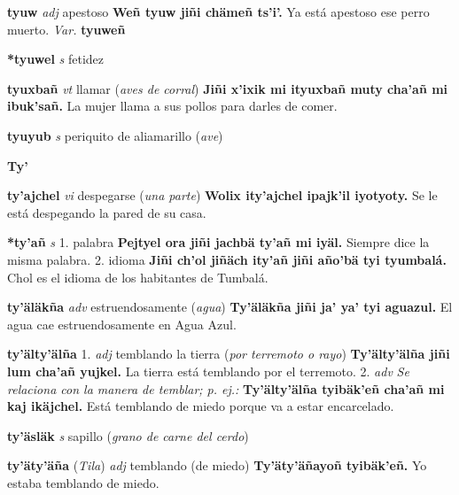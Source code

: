 \documentclass[10pt]{scrbook}
\newcommand{\entry}[1]{\textbf{#1}}
\newcommand{\alphaletter}[1]{\end{multicols}\addsec{#1}\begin{multicols}{2}}
\newcommand{\onedefinition}[1]{#1.}
\newcommand{\nontranslationdef}[1]{\textit{#1}}
\newcommand{\partofspeech}[1]{\textit{#1}}
\newcommand{\spanishtranslation}[1]{#1}
\newcommand{\clarification}[1]{(\textit{#1})}
\newcommand{\cholexample}[1]{\textbf{#1}}
\newcommand{\exampletranslation}[1]{#1}
\newcommand{\relevantdialect}[1]{(\textit{#1})}
\newcommand{\variation}[1]{\textit{Var.} \textbf{#1}}
\begin{document}
\begin{multicols}{2}
\entry{tyuw}
\partofspeech{adj}
\spanishtranslation{apestoso}
\cholexample{Weñ tyuw jiñi chämeñ ts'i'.}
\exampletranslation{Ya está apestoso ese perro muerto.}
\variation{tyuweñ}

\entry{*tyuwel}
\partofspeech{s}
\spanishtranslation{fetidez}

\entry{tyuxbañ}
\partofspeech{vt}
\spanishtranslation{llamar}
\clarification{aves de corral}
\cholexample{Jiñi x'ixik mi ityuxbañ muty cha'añ mi ibuk'sañ.}
\exampletranslation{La mujer llama a sus pollos para darles de comer.}

\entry{tyuyub}
\partofspeech{s}
\spanishtranslation{periquito de aliamarillo}
\clarification{ave}

\entry{Ty'}
\alphaletter{Ty'}

\entry{ty'ajchel}
\partofspeech{vi}
\spanishtranslation{despegarse}
\clarification{una parte}
\cholexample{Wolix ity'ajchel ipajk'il iyotyoty.}
\exampletranslation{Se le está despegando la pared de su casa.}

\entry{*ty'añ}
\partofspeech{s}
\onedefinition{1}
\spanishtranslation{palabra}
\cholexample{Pejtyel ora jiñi jachbä ty'añ mi iyäl.}
\exampletranslation{Siempre dice la misma palabra.}
\onedefinition{2}
\spanishtranslation{idioma}
\cholexample{Jiñi ch'ol jiñäch ity'añ jiñi año'bä tyi tyumbalá.}
\exampletranslation{Chol es el idioma de los habitantes de Tumbalá.}

\entry{ty'äläkña}
\partofspeech{adv}
\spanishtranslation{estruendosamente}
\clarification{agua}
\cholexample{Ty'äläkña jiñi ja' ya' tyi aguazul.}
\exampletranslation{El agua cae estruendosamente en Agua Azul.}

\entry{ty'älty'älña}
\onedefinition{1}
\partofspeech{adj}
\spanishtranslation{temblando la tierra}
\clarification{por terremoto o rayo}
\cholexample{Ty'älty'älña jiñi lum cha'añ yujkel.}
\exampletranslation{La tierra está temblando por el terremoto.}
\onedefinition{2}
\partofspeech{adv}
\nontranslationdef{Se relaciona con la manera de temblar; p. ej.:}
\cholexample{Ty'älty'älña tyibäk'eñ cha'añ mi kaj ikäjchel.}
\exampletranslation{Está temblando de miedo porque va a estar encarcelado.}

\entry{ty'äsläk}
\partofspeech{s}
\spanishtranslation{sapillo}
\clarification{grano de carne del cerdo}

\entry{ty'äty'äña}
\relevantdialect{Tila}
\partofspeech{adj}
\spanishtranslation{temblando (de miedo)}
\cholexample{Ty'äty'äñayoñ tyibäk'eñ.}
\exampletranslation{Yo estaba temblando de miedo.}


\end{multicols}
\end{document}
